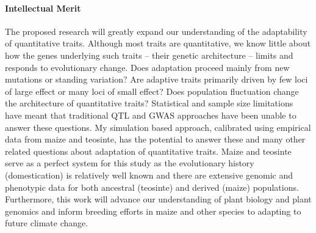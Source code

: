 \paragraph{Intellectual Merit}  


The proposed research will greatly expand our understanding of the adaptability of quantitative traits. Although most traits are quantitative, we know little about how the genes underlying such traits -- their genetic architecture -- limits and responds to evolutionary change. Does adaptation proceed mainly from new mutations or standing variation? Are adaptive traits primarily driven by few loci of large effect or many loci of small effect? Does population fluctuation change the architecture of quantitative traits? Statistical and sample size limitations have meant that traditional QTL and GWAS approaches have been unable to answer these questions. My simulation based approach, calibrated using empirical data from maize and teosinte, has the potential to answer these and many other related questions about adaptation of quantitative traits.  Maize and teosinte serve as a perfect system for this study as the evolutionary history (domestication) is relatively well known and there are extensive genomic and phenotypic data for both ancestral (teosinte) and derived (maize) populations. Furthermore, this work will advance our understanding of plant biology and plant genomics and inform breeding efforts in maize and other species to adapting to future climate change. 


